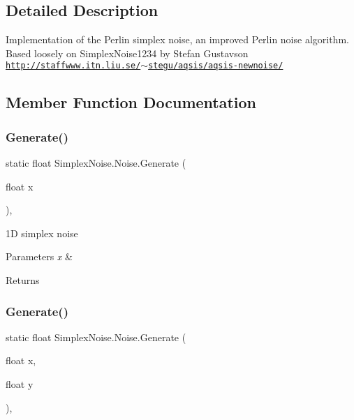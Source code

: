 \subsection{Detailed Description}
Implementation of the Perlin simplex noise, an improved Perlin noise algorithm. Based loosely on Simplex\+Noise1234 by Stefan Gustavson \href{http://staffwww.itn.liu.se/~stegu/aqsis/aqsis-newnoise/}{\tt http\+://staffwww.\+itn.\+liu.\+se/$\sim$stegu/aqsis/aqsis-\/newnoise/} 



\subsection{Member Function Documentation}
\mbox{\label{class_simplex_noise_1_1_noise_ab06f7e36078de3f6e050464076fae245}} 
\subsubsection{\texorpdfstring{Generate()}{Generate()}\hspace{0.1cm}{\footnotesize\ttfamily [1/3]}}
{\footnotesize\ttfamily static float Simplex\+Noise.\+Noise.\+Generate (\begin{DoxyParamCaption}\item[{float}]{x }\end{DoxyParamCaption})\hspace{0.3cm}{\ttfamily [inline]}, {\ttfamily [static]}}



1D simplex noise 


\begin{DoxyParams}{Parameters}
{\em x} & \\
\hline
\end{DoxyParams}
\begin{DoxyReturn}{Returns}

\end{DoxyReturn}
\mbox{\label{class_simplex_noise_1_1_noise_a4f34ca0d2996f9ea0d3a05eba853a6bd}} 
\subsubsection{\texorpdfstring{Generate()}{Generate()}\hspace{0.1cm}{\footnotesize\ttfamily [2/3]}}
{\footnotesize\ttfamily static float Simplex\+Noise.\+Noise.\+Generate (\begin{DoxyParamCaption}\item[{float}]{x,  }\item[{float}]{y }\end{DoxyParamCaption})\hspace{0.3cm}{\ttfamily [inline]}, {\ttfamily [static]}}



